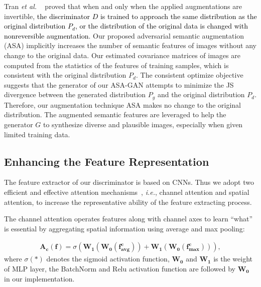 \documentclass[10pt,journal,compsoc]{IEEEtran}
\newcommand{\ie}{\textit{i.e.}}
\newcommand{\revise}[1]{\textcolor{black}{#1}}
\begin{document}
Tran \emph{et al.} ~\cite{tran2021on} proved that when and only when the applied augmentations are invertible, \revise{the discriminator $D$ is trained to approach the same distribution as the original distribution $P_{d}$, or the distribution of the original data is changed with nonreversible augmentation}.
%
Our proposed adversarial semantic augmentation (ASA) implicitly increases the number of semantic features of images without any change to the original data.
%
Our estimated covariance matrices of images are computed from the statistics of the features of training samples, which is consistent with the original distribution $P_{d}$.
%
The consistent optimize objective suggests that the generator of our ASA-GAN attempts to minimize the JS divergence between the generated distribution $P_{g}$ and the original distribution $P_{d}$.
%
Therefore, our augmentation technique ASA makes no change to the original distribution.
%
The augmented semantic features are leveraged to help the generator $G$ to synthesize diverse and plausible images, especially when given limited training data.

\subsection{Enhancing the Feature Representation}

The feature extractor of our discriminator is based on CNNs. Thus we adopt two efficient and effective attention mechanisms~\cite{woo2018cbam}, \ie, channel attention and spatial attention, to increase the representative ability of the feature extracting process.

The channel attention operates features along with channel axes to learn ``what'' is essential by aggregating spatial information using average and max pooling:

\vspace{-3mm}
\begin{equation}
\begin{aligned}
\mathbf{A}_{\mathbf{c}}(\mathbf{f})=\sigma\left(\mathbf{W}_{\mathbf{1}}\left(\mathbf{W}_{\mathbf{0}}\left(\mathbf{f}_{\mathbf{a v g}}^{\mathbf{c}}\right)\right)+\mathbf{W}_{\mathbf{1}}\left(\mathbf{W}_{\mathbf{0}}\left(\mathbf{f}_{\mathbf{max}}^{\mathbf{c}}\right)\right)\right),
\end{aligned}
\end{equation} where $\sigma(*)$ denotes the sigmoid activation function, $\mathbf{W}_{\mathbf{0}}$ and $\mathbf{W}_{\mathbf{1}}$ is the weight of MLP layer, the BatchNorm and Relu activation function are followed by $\mathbf{W}_{\mathbf{0}}$ in our implementation.
\end{document}
